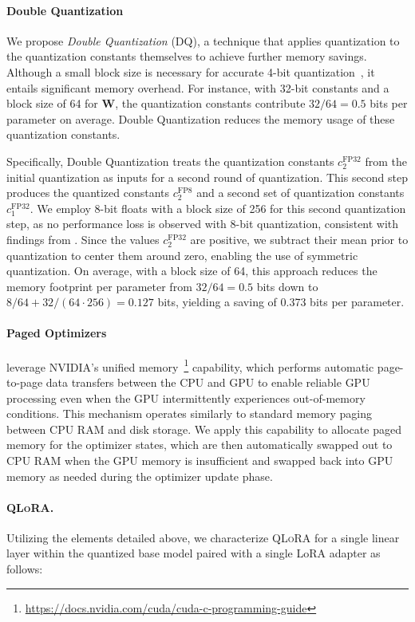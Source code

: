 \paragraph{Double Quantization{}} 
We propose \emph{Double Quantization} (DQ), a technique that applies quantization to the quantization constants themselves to achieve further memory savings. Although a small block size is necessary for accurate 4-bit quantization~\citep{dettmers2022case}, it entails significant memory overhead. For instance, with 32-bit constants and a block size of 64 for $\mathbf{W}$, the quantization constants contribute $32/64 = 0.5$ bits per parameter on average. Double Quantization reduces the memory usage of these quantization constants.

Specifically, Double Quantization treats the quantization constants $c_2^{\text{FP32}}$ from the initial quantization as inputs for a second round of quantization. This second step produces the quantized constants $c_2^{\text{FP8}}$ and a second set of quantization constants $c_1^{\text{FP32}}$. We employ 8-bit floats with a block size of 256 for this second quantization step, as no performance loss is observed with 8-bit quantization, consistent with findings from \citet{dettmers2022case}. Since the values $c_2^{\text{FP32}}$ are positive, we subtract their mean prior to quantization to center them around zero, enabling the use of symmetric quantization. On average, with a block size of 64, this approach reduces the memory footprint per parameter from $32/64=0.5$ bits down to $8/64 + 32/(64\cdot256) = 0.127$ bits, yielding a saving of 0.373 bits per parameter.

\paragraph{Paged Optimizers} leverage NVIDIA's unified memory~\footnote{\tiny \url{https://docs.nvidia.com/cuda/cuda-c-programming-guide}} capability, which performs automatic page-to-page data transfers between the CPU and GPU to enable reliable GPU processing even when the GPU intermittently experiences out-of-memory conditions. This mechanism operates similarly to standard memory paging between CPU RAM and disk storage. We apply this capability to allocate paged memory for the optimizer states, which are then automatically swapped out to CPU RAM when the GPU memory is insufficient and swapped back into GPU memory as needed during the optimizer update phase.

\paragraph{\textsc{QLoRA}.} Utilizing the elements detailed above, we characterize \textsc{QLoRA} for a single linear layer within the quantized base model paired with a single LoRA adapter as follows:

